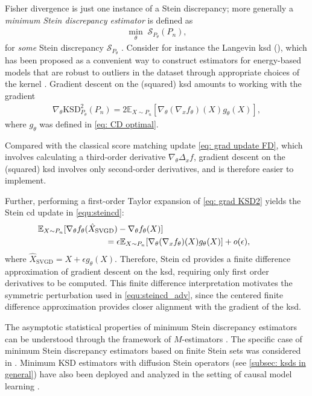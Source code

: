 \documentclass[12pt,paper=letter]{scrreprt}
\def\mbb#1{\mathbb{#1}}
\def\E{\mbb{E}} %
\begin{document}
Fisher divergence is just one instance of a Stein discrepancy; more generally a \emph{minimum Stein discrepancy estimator} is defined as
\begin{align*}
    \min_\theta \; \mathcal{S}_{P_\theta}(P_n) ,
\end{align*}
for \emph{some} Stein discrepancy $\mathcal{S}_{P_\theta}$  \citep{liu2017learning,liu2019estimation,barp2019minimum}.
Consider for instance the Langevin \ac{ksd} (), which has been proposed as a convenient way to construct estimators for energy-based models that are robust to outliers in the dataset through appropriate choices of the kernel \citep{barp2019minimum}. 
Gradient descent on the (squared) \ac{ksd} amounts to working with the gradient
\begin{align}
\nabla_{\theta} \mathrm{KSD}_{P_\theta}^2(P_n) 
=  2 \E_{X\sim P_n}[\nabla_\theta (\nabla_xf_\theta)(X) g_\theta(X)], \label{eq: grad KSD2}
\end{align} 
where $g_\theta$ was defined in \eqref{eq: CD optimal}.

Compared with the classical score matching update \eqref{eq: grad update FD}, which involves calculating a third-order derivative $\nabla_\theta\Delta_x f$, gradient descent on the (squared) \ac{ksd} involves only second-order derivatives, and is therefore easier to implement.

Further, performing a first-order Taylor expansion of \eqref{eq: grad KSD2} yields the Stein \ac{cd} update in \eqref{equ:steincd}:
\begin{align*}
& \hspace{-30pt} \mathbb{E}_{X \sim P_n}[ \nabla_\theta f_\theta(\hat X_{\mathrm{SVGD}}) - \nabla_\theta f_\theta(X) ] \\
& \hspace{50pt} =  \epsilon \mathbb{E}_{X \sim P_n}[  \nabla_\theta (\nabla_xf_\theta)(X) g_\theta(X) ] + o(\epsilon), 
\end{align*}
where $\hat X_{\mathrm{SVGD}} = X + \epsilon g_\theta(X)$. 
Therefore, Stein \ac{cd} provides a finite difference approximation of gradient descent on the \ac{ksd}, requiring only first order derivatives to be computed. 
This finite difference interpretation motivates the symmetric perturbation used in \eqref{equ:steincd_adv}, since the centered finite difference approximation provides closer alignment with the gradient of the \ac{ksd}. 

The asymptotic statistical properties of minimum Stein discrepancy estimators can be understood through the framework of $M$-estimators \citep{barp2019minimum,matsubara2022robust,oates2022minimum}.
The specific case of minimum Stein discrepancy estimators based on finite Stein sets was considered in \citet{ebner2025stein}. 
Minimum KSD estimators with diffusion Stein operators (see \cref{subsec: ksds in general}) have also been deployed and analyzed in the setting of causal model learning \citep{lorch2024causal,bleile2026efficient}.
\end{document}

